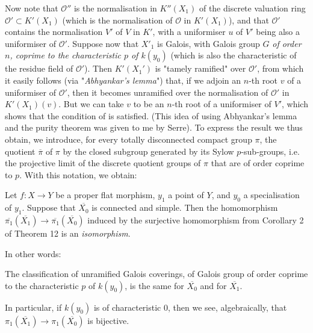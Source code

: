 Now note that $\mathcal{O}''$ is the normalisation in $K''(X_1)$ of the discrete valuation ring $\mathcal{O}'\subset K'(X_1)$ (which is the normalisation of $\mathcal{O}$ in $K'(X_1)$), and that $\mathcal{O}'$ contains the normalisation $V'$ of $V$ in $K'$, with a uniformiser $u$ of $V'$ being also a uniformiser of $\mathcal{O}'$.
Suppose now that $X'_1$ is Galois, with Galois group $G$ \emph{of order $n$, coprime to the characteristic $p$ of $k(y_0)$} (which is also the characteristic of the residue field of $\mathcal{O}'$).
Then $K'(X_1')$ is "tamely ramified" over $\mathcal{O}'$, from which it easily follows (via "\emph{Abhyankar's lemma}") that, if we adjoin an $n$-th root $v$ of a uniformiser of $\mathcal{O}'$, then it becomes unramified over the normalisation of $\mathcal{O}'$ in $K'(X_1)(v)$.
But we can take $v$ to be an $n$-th root of a uniformiser of $V'$, which shows that the condition of  is satisfied.
(This idea of using Abhyankar's lemma and the purity theorem was given to me by Serre).
To express the result we thus obtain, we introduce, for every totally disconnected compact group $\pi$, the quotient $\overline{\pi}$ of $\pi$ by the closed subgroup generated by its Sylow $p$-sub-groups, i.e. the projective limit of the discrete quotient groups of $\pi$ that are of order coprime to $p$.
With this notation, we obtain:

\begin{theorem}\label{fga2-theorem-13}
    Let $f\colon X\to Y$ be a proper flat morphism, $y_1$ a point of $Y$, and $y_0$ a specialisation of $y_1$.
    Suppose that $\overline{X_0}$ is connected and simple.
    Then the homomorphism $\overline{\pi_1}(\overline{X_1})\to\overline{\pi_1}(\overline{X_0})$ induced by the
    surjective homomorphism from Corollary 2 of Theorem 12  is an \emph{isomorphism}.
\end{theorem}

In other words:

\begin{corollary}\label{fga2-theorem-13-corollary-1}
    The classification of unramified Galois coverings, of Galois group of order coprime to the characteristic $p$ of $k(y_0)$, is the same for $\overline{X_0}$ and for $\overline{X_1}$.
\end{corollary}

In particular, if $k(y_0)$ is of characteristic $0$, then we see, algebraically, that $\pi_1(\overline{X_1})\to\pi_1(\overline{X_0})$ is bijective.

